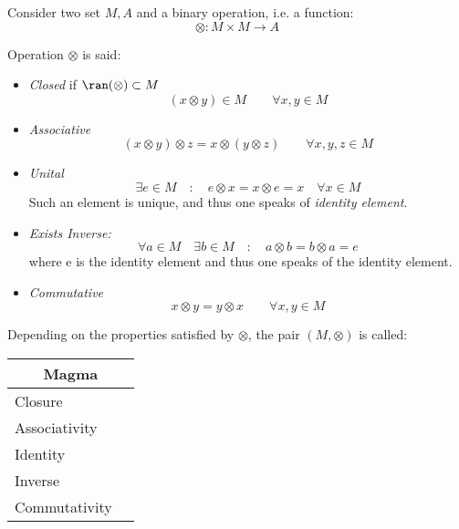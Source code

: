 \documentclass[a4paper,12pt]{scrartcl}
\newcommand{\OpA}{\otimes}
\begin{document}
\begin{landscape}
    	
    	
		Consider two set $M, A$ and a binary operation, i.e. a function:
		\begin{displaymath}
			\OpA : M \times M \rightarrow A
		\end{displaymath}
	\begin{minipage}[c][.80\textheight]{0.40 \linewidth}
Operation $\OpA$ is said:
\begin{itemize}
\item \emph{Closed} if $\ran(\OpA)\subset M$
	\begin{equation}\label{Closure}
		( x \OpA y ) \in M \qquad \forall x,y\in M
	\end{equation}
\item \emph{Associative}
	\begin{equation}\label{Associativity}
		(x \OpA y) \OpA z = x \OpA (y \OpA z) \qquad \forall x,y,z \in M
	\end{equation}
\item \emph{Unital}
	\begin{equation}\label{ExistsUnit}
		\exists e \in M \quad : \quad e \OpA x = x \OpA e = x \quad \forall x \in M
	\end{equation}
	Such an element is unique, and thus one speaks of \emph{identity element}.
\item \emph{Exists Inverse:}
	\begin{equation}\label{ExistsInverse}
		\forall a \in M \quad \exists b \in M \quad : \quad a \OpA b = b \OpA a = e
	\end{equation}
	where e is the identity element and thus one speaks of the identity element.
\item \emph{Commutative}
	\begin{equation}\label{Commutativity}
		x \OpA y = y \OpA x \qquad \forall x,y\in M
	\end{equation}
\end{itemize}

Depending on the properties satisfied by $\OpA$, the pair $(M,\OpA)$ is called:
	\end{minipage}
	\hspace{1cm}
\begin{minipage}[c][.80\textheight]{0,5\textwidth}

\begin{tabular}{|l|p{2cm}|} %
  \hline
  \multicolumn{2}{c}{\cellcolor{yellow!25}Magma} \\
  \hline
   \cellcolor{blue!25} Closure&  \\
    \cellcolor{red!25} Associativity&  \\
    \cellcolor{red!25} Identity&  \\
    \cellcolor{red!25} Inverse&  \\
    \cellcolor{red!25} Commutativity&  \\
  \hline
\end{tabular}


\end{minipage}
\end{landscape}
\end{document}
